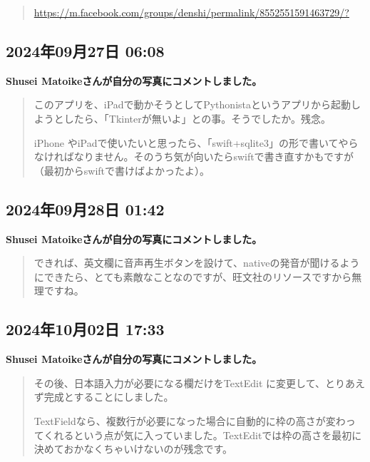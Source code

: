 \begin{quote}
\url{https://m.facebook.com/groups/denshi/permalink/8552551591463729/?}
\end{quote}

\subsection*{2024年09月27日 06:08}

\textbf{Shusei Matoikeさんが自分の写真にコメントしました。}

\begin{quote}
このアプリを、iPadで動かそうとしてPythonistaというアプリから起動しようとしたら、「Tkinterが無いよ」との事。そうでしたか。残念。

iPhone やiPadで使いたいと思ったら、「swift+sqlite3」の形で書いてやらなければなりません。そのうち気が向いたらswiftで書き直すかもですが（最初からswiftで書けばよかったよ）。
\end{quote}

\subsection*{2024年09月28日 01:42}

\textbf{Shusei Matoikeさんが自分の写真にコメントしました。}

\begin{quote}
できれば、英文欄に音声再生ボタンを設けて、nativeの発音が聞けるようにできたら、とても素敵なことなのですが、旺文社のリソースですから無理ですね。
\end{quote}

\subsection*{2024年10月02日 17:33}

\textbf{Shusei Matoikeさんが自分の写真にコメントしました。}

\begin{quote}
その後、日本語入力が必要になる欄だけをTextEdit に変更して、とりあえず完成とすることにしました。

TextFieldなら、複数行が必要になった場合に自動的に枠の高さが変わってくれるという点が気に入っていました。TextEditでは枠の高さを最初に決めておかなくちゃいけないのが残念です。
\end{quote}


